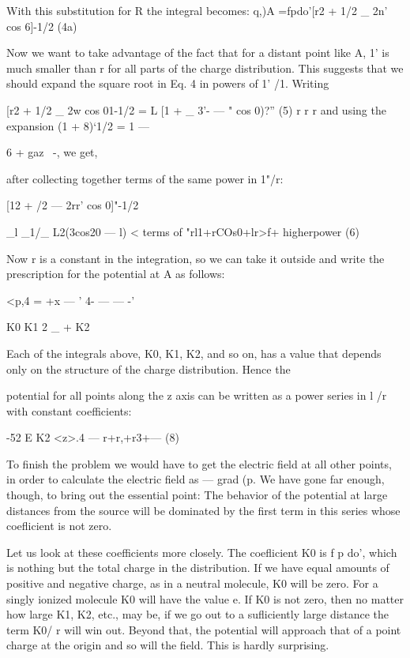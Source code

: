 With this substitution for R the integral becomes:
q,)A =fpdo'[r2 + 1/2 _ 2n' cos 6]-1/2 (4a)

Now we want to take advantage of the fact that for a distant point
like A, 1' is much smaller than r for all parts of the charge distribution.
This suggests that we should expand the square root in Eq. 4 in
powers of 1' /1. Writing

\begin{equation}
\end{equation}
[r2 + 1/2 _ 2w cos 01-1/2 = L [1 +  _ 3'- --- " cos 0)?'' (5)
r r r
and using the expansion (1 + 8)‘1/2 = 1  ---  {6 + gaz ~-, we get,

after collecting together terms of the same power in 1"/r:

\begin{equation}
\end{equation}
[12 + /2  ---  2rr' cos 0]"-1/2

_l _1/_ L2(3cos20 --- l) < terms of 
"rl1+rCOs0+lr>f+ higherpower (6)

Now r is a constant in the integration, so we can take it outside and
write the prescription for the potential at A as follows:

\begin{equation}
\end{equation}
<p,4 = %
+x --- ' 4-\/ ---  --- -'

K0 K1
2 _
+ %
K2

Each of the integrals above, K0, K1, K2, and so on, has a value that
depends only on the structure of the charge distribution. Hence the

potential for all points along the z axis can be written as a power series
in l /r with constant coefficients:

\begin{equation}
\end{equation}
-52 E K2
<z>.4 --- r+r,+r3+--- (8)

To finish the problem we would have to get the electric field at all
other points, in order to calculate the electric field as  --- grad (p. We
have gone far enough, though, to bring out the essential point: The
behavior of the potential at large distances from the source will be
dominated by the first term in this series whose coeflicient is not zero.

Let us look at these coefficients more closely. The coeflicient K0
is f p do', which is nothing but the total charge in the distribution.
If we have equal amounts of positive and negative charge, as in a
neutral molecule, K0 will be zero. For a singly ionized molecule K0
will have the value e. If K0 is not zero, then no matter how large
K1, K2, etc., may be, if we go out to a sufliciently large distance the
term K0/ r will win out. Beyond that, the potential will approach that
of a point charge at the origin and so will the field. This is hardly
surprising.

}
